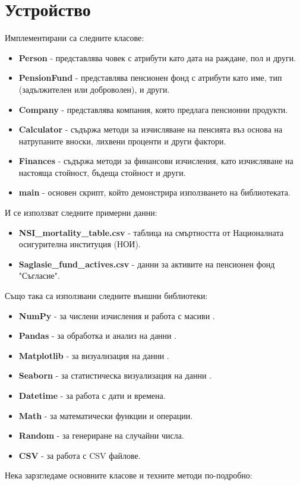 \documentclass[a4paper,12pt]{article}
\begin{document}
\section{Устройство}
Имплементирани са следните класове:
\begin{itemize}
        \item \textbf{Person} - представлява човек с атрибути като дата на раждане, пол и други.
        \item \textbf{PensionFund} - представлява пенсионен фонд с атрибути като име, тип (задължителен или доброволен), и други.
        \item \textbf{Company} - представлява компания, която предлага пенсионни продукти.
        \item \textbf{Calculator} - съдържа методи за изчисляване на пенсията въз основа на натрупаните вноски, лихвени проценти и други фактори.
        \item \textbf{Finances} - съдържа методи за финансови изчисления, като изчисляване на настояща стойност, бъдеща стойност и други.
        \item \textbf{main} - основен скрипт, който демонстрира използването на библиотеката.
\end{itemize}
И се използват следните примерни данни:
\begin{itemize}
        \item \textbf{NSI\_mortality\_table.csv} - таблица на смъртността от Националната осигурителна институция (НОИ).
        \item \textbf{Saglasie\_fund\_actives.csv} - данни за активите на пенсионен фонд "Съгласие".
\end{itemize}
Също така са използвани следните външни библиотеки:
\begin{itemize}
        \item \textbf{NumPy} - за числени изчисления и работа с масиви \cite{numpy2024}.
        \item \textbf{Pandas} - за обработка и анализ на данни \cite{pandas2024}.
        \item \textbf{Matplotlib} - за визуализация на данни \cite{matplotlib2024}.
        \item \textbf{Seaborn} - за статистическа визуализация на данни \cite{seaborn2024}.
        \item \textbf{Datetime} - за работа с дати и времена.
        \item \textbf{Math} - за математически функции и операции.
        \item \textbf{Random} - за генериране на случайни числа.
        \item \textbf{CSV} - за работа с CSV файлове.
\end{itemize}
Нека зарзгледаме основните класове и техните методи по-подробно:
\end{document}
